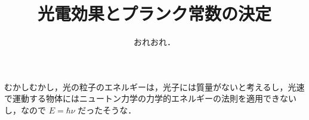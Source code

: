 \documentclass[11pt,a4,epsf]{jreport}
\title{光電効果とプランク常数の決定}
\author{おれおれ．}
\date{}
\begin{document}
\maketitle

むかしむかし，光の粒子のエネルギーは，光子には質量がないと考えるし，光速で運動する物体にはニュートン力学の力学的エネルギーの法則を適用できないし，なので
$E = \hbar \nu$
だったそうな．
\end{document}
